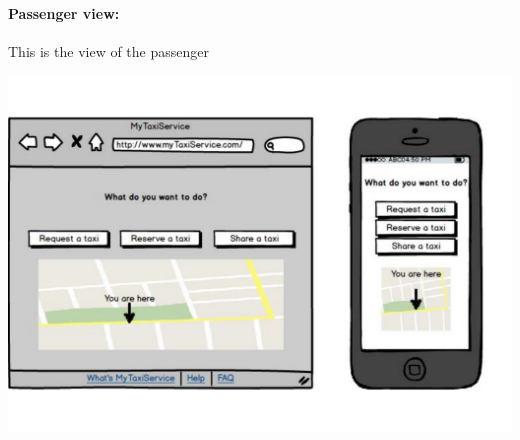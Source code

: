 \paragraph{Passenger view:}
This is the view of the passenger
\begin{center}
	\includegraphics[width=\textwidth]{mockup/passengerFunctions.pdf}
\end{center}

